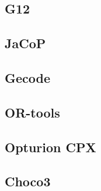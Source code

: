 \subsection{G12}
\cite{mz_manual}
\subsection{JaCoP}
\cite{jacop_overview}
\subsection{Gecode}
\cite{gecode}
\subsection{OR-tools}
\cite{or_manual}
\subsection{Opturion CPX}
\cite{cpx}
\subsection{Choco3}
\cite{choco}